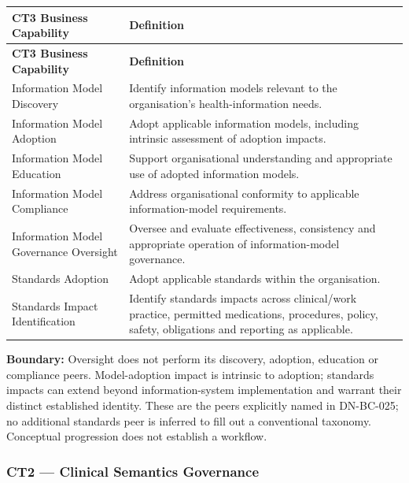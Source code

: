 \label{rad:business:699}
\begingroup\small\setlength{\TableWidth}{\dimexpr\linewidth-4\tabcolsep-3\arrayrulewidth\relax}
\begin{longtable}{|>{\raggedright\arraybackslash}p{0.35\TableWidth}|>{\raggedright\arraybackslash}p{0.65\TableWidth}|}
\hline\rowcolor{TableHead}\textbf{CT3 Business Capability} & \textbf{Definition}\\\hline\endfirsthead
\hline\rowcolor{TableHead}\textbf{CT3 Business Capability} & \textbf{Definition}\\\hline\endhead
\hline\endfoot
Information Model Discovery & Identify information models relevant to the organisation’s health-information needs.\\\hline
Information Model Adoption & Adopt applicable information models, including intrinsic assessment of adoption impacts.\\\hline
Information Model Education & Support organisational understanding and appropriate use of adopted information models.\\\hline
Information Model Compliance & Address organisational conformity to applicable information-model requirements.\\\hline
Information Model Governance Oversight & Oversee and evaluate effectiveness, consistency and appropriate operation of information-model governance.\\\hline
Standards Adoption & Adopt applicable standards within the organisation.\\\hline
Standards Impact Identification & Identify standards impacts across clinical/\allowbreak{}work practice, permitted medications, procedures, policy, safety, obligations and reporting as applicable.\\\hline
\end{longtable}\endgroup
{}\label{rad:business:709}

\textbf{Boundary:} Oversight does not perform its discovery, adoption, education or compliance peers. Model-adoption impact is intrinsic to adoption; standards impacts can extend beyond information-system implementation and warrant their distinct established identity. These are the peers explicitly named in DN-BC-025; no additional standards peer is inferred to fill out a conventional taxonomy. Conceptual progression does not establish a workflow.

\label{rad:business:711}
\subsubsection*{CT2 — Clinical Semantics Governance}
\label{rad:business:713}

